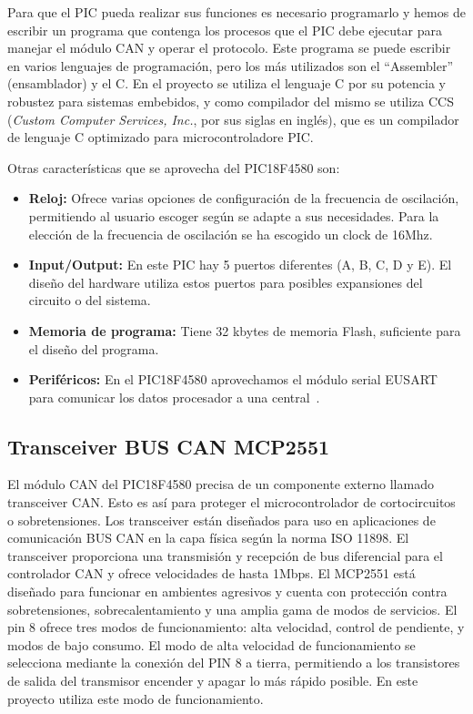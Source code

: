 Para que el PIC pueda realizar sus funciones es necesario programarlo y hemos de escribir un programa que contenga los procesos que el PIC debe ejecutar para manejar el módulo CAN y operar el protocolo. 
Este programa se puede escribir en varios lenguajes de programación, pero los  más utilizados son el ``Assembler'' (ensamblador) y el C. 
En el proyecto se utiliza el lenguaje C por su potencia y robustez para sistemas embebidos, y como compilador del mismo se utiliza CCS (\textit{Custom Computer Services, Inc.}, por sus siglas en inglés), que es un compilador de lenguaje C optimizado para microcontroladore PIC.

Otras características que se aprovecha del PIC18F4580 son: 
\begin{itemize}
\item {\textbf{Reloj:}} Ofrece varias opciones de configuración de la frecuencia de oscilación, permitiendo al usuario escoger según se adapte a sus necesidades.
Para la elección de la frecuencia de oscilación se ha escogido un clock de 16Mhz.
\item {\textbf{Input/Output:}} En este PIC hay 5 puertos diferentes (A, B, C, D y E). El diseño del hardware utiliza estos puertos para posibles expansiones del circuito o del sistema. 
\item {\textbf{Memoria de programa:}} Tiene 32 kbytes de memoria Flash, suficiente para el diseño del programa.
\item {\textbf{Periféricos:}} En el PIC18F4580 aprovechamos el módulo serial EUSART para comunicar los datos procesador a una central~\cite{DaP}.

\end{itemize}


\subsection{Transceiver BUS CAN MCP2551}
El módulo CAN del  PIC18F4580 precisa de un componente externo llamado transceiver CAN. 
Esto es así para proteger el microcontrolador de cortocircuitos o sobretensiones. 
Los transceiver están diseñados para uso en aplicaciones de comunicación BUS CAN en la capa física según la norma ISO 11898. 
El transceiver proporciona una transmisión y recepción de bus diferencial para el controlador CAN y ofrece velocidades de hasta 1Mbps.
El MCP2551 está diseñado para funcionar en ambientes agresivos y cuenta con protección contra sobretensiones, sobrecalentamiento y una amplia gama de modos de servicios. 
El pin 8 ofrece tres modos de funcionamiento: alta velocidad, control de pendiente, y modos de bajo consumo.
El modo de alta velocidad de funcionamiento se selecciona mediante la conexión del PIN 8 a tierra, permitiendo a los transistores de salida del transmisor encender y apagar lo más rápido posible. 
En este proyecto utiliza este modo de funcionamiento.

